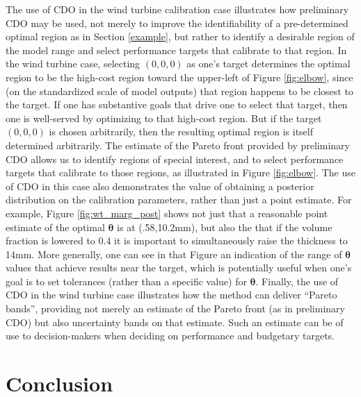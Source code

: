 \documentclass[12pt]{article}
\begin{document}
The use of CDO in the wind turbine calibration case illustrates how preliminary CDO may be used, not merely to improve the identifiability of a pre-determined optimal region as in Section \ref{example}, but rather to identify a desirable region of the model range and select performance targets that calibrate to that region.
%
In the wind turbine case, selecting $(0,0,0)$ as one's target determines the optimal region to be the high-cost region toward the upper-left of Figure \ref{fig:elbow}, since (on the standardized scale of model outputs) that region happens to be closest to the target.
%
If one has substantive goals that drive one to select that target, then one is well-served by optimizing to that high-cost region.
%
But if the target $(0,0,0)$ is chosen arbitrarily, then the resulting optimal region is itself determined arbitrarily.
%
The estimate of the Pareto front provided by preliminary CDO allows us to identify regions of special interest, and to select performance targets that calibrate to those regions, as illustrated in Figure \ref{fig:elbow}.
%
The use of CDO in this case also demonstrates the value of obtaining a posterior distribution on the calibration parameters, rather than just a point estimate.
%
For example, Figure \ref{fig:wt_marg_post} shows not just that a reasonable point estimate of the optimal $\boldsymbol\theta$ is at (.58,10.2mm), but also the that if the volume fraction is lowered to 0.4 it is important to simultaneously raise the thickness to 14mm.
%
More generally, one can see in that Figure an indication of the range of $\boldsymbol\theta$ values that achieve results near the target, which is potentially useful when one's goal is to set tolerances (rather than a specific value) for $\boldsymbol\theta$.
%
Finally, the use of CDO in the wind turbine case illustrates how the method can deliver ``Pareto bands'', providing not merely an estimate of the Pareto front (as in preliminary CDO) but also uncertainty bands on that estimate.
%
Such an estimate can be of use to decision-makers when deciding on performance and budgetary targets.




\section{Conclusion} \label{conclusion}
\end{document}
